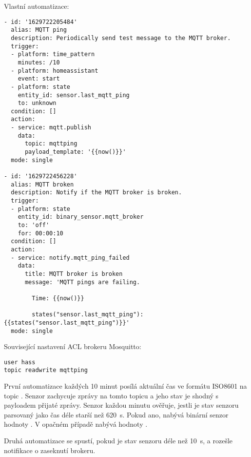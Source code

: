 Vlastní automatizace:
\begin{lstlisting}
- id: '1629722205484'
  alias: MQTT ping
  description: Periodically send test message to the MQTT broker.
  trigger:
  - platform: time_pattern
    minutes: /10
  - platform: homeassistant
    event: start
  - platform: state
    entity_id: sensor.last_mqtt_ping
    to: unknown
  condition: []
  action:
  - service: mqtt.publish
    data:
      topic: mqttping
      payload_template: '{{now()}}'
  mode: single

- id: '1629722456228'
  alias: MQTT broken
  description: Notify if the MQTT broker is broken.
  trigger:
  - platform: state
    entity_id: binary_sensor.mqtt_broker
    to: 'off'
    for: 00:00:10
  condition: []
  action:
  - service: notify.mqtt_ping_failed
    data:
      title: MQTT broker is broken
      message: 'MQTT pings are failing.

        Time: {{now()}}

        states("sensor.last_mqtt_ping"): {{states("sensor.last_mqtt_ping")}}'
  mode: single
\end{lstlisting}


Související nastavení ACL brokeru Mosquitto:
\begin{verbatim}
user hass
topic readwrite mqttping
\end{verbatim}


První automatizace každých 10 minut posílá aktuální čas ve formátu ISO8601 na
topic . Senzor  zachycuje
zprávy na tomto topicu a jeho stav je shodný s payloadem přijaté zprávy.
Senzor  každou minutu ověřuje, jestli je
stav senzoru  parsovaný jako čas déle starší
než \SI{620}{\second}. Pokud ano, nabývá binární senzor hodnoty .
V opačném případě nabývá hodnoty .

Druhá automatizace se spustí, pokud je stav senzoru
  déle než \SI{10}{\second},
a rozešle notifikace o zaseknutí brokeru.
